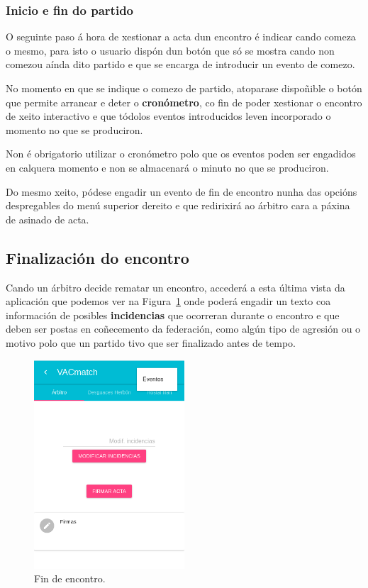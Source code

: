       \subsubsection{Inicio e fin do partido}
      O seguinte paso á hora de xestionar a acta dun encontro é indicar cando 
comeza o mesmo, para isto o usuario dispón dun botón que só se mostra cando 
non comezou aínda dito partido e que se encarga de introducir un evento de 
comezo.

      No momento en que se indique o comezo de partido, atoparase dispoñible 
o botón que permite arrancar e deter o \textbf{cronómetro}, co fin de poder 
xestionar o encontro de xeito interactivo e que tódolos eventos introducidos 
leven incorporado o momento no que se produciron.

      Non é obrigatorio utilizar o cronómetro polo que os eventos poden ser 
engadidos en calquera momento e non se almacenará o minuto no que se produciron.

      Do mesmo xeito, pódese engadir un evento de fin de encontro nunha das 
opcións despregables do menú superior dereito e que redirixirá ao árbitro cara 
a páxina de asinado de acta.

    \subsection{Finalización do encontro}
    Cando un árbitro decide rematar un encontro, accederá a esta última vista 
da aplicación que podemos ver na Figura~\ref{fig:design:endmatch} onde 
poderá engadir un texto coa información de posibles 
\textbf{incidencias} que ocorreran durante o encontro e que deben ser postas en 
coñecemento da federación, como algún tipo de agresión ou o motivo polo que un 
partido tivo que ser finalizado antes de tempo.

    \begin{figure}[h!]
      \begin{center}
      \includegraphics[width=0.5\textwidth]{./img/demo/10_endmatch.png}
      \caption{Fin de encontro.}
      \label{fig:design:endmatch}
      \end{center}
    \end{figure}

